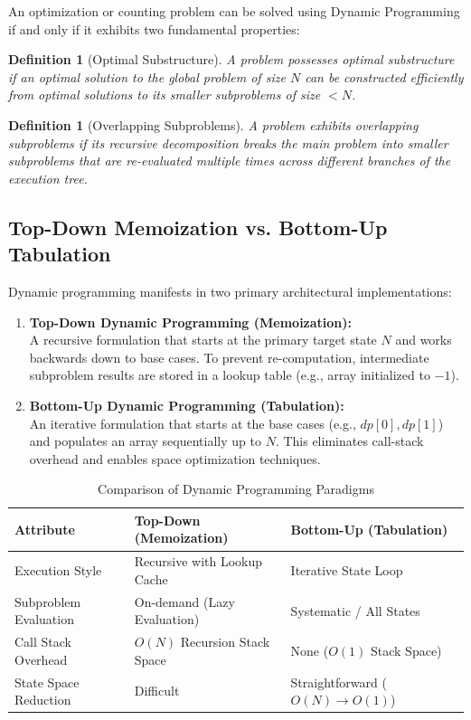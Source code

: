 \documentclass[10pt,journal,compsoc,onecolumn]{IEEEtran}
\newtheorem{definition}[theorem]{Definition}
\begin{document}
An optimization or counting problem can be solved using Dynamic Programming if and only if it exhibits two fundamental properties:

\begin{definition}[Optimal Substructure]
A problem possesses optimal substructure if an optimal solution to the global problem of size $N$ can be constructed efficiently from optimal solutions to its smaller subproblems of size $< N$.
\end{definition}

\begin{definition}[Overlapping Subproblems]
A problem exhibits overlapping subproblems if its recursive decomposition breaks the main problem into smaller subproblems that are re-evaluated multiple times across different branches of the execution tree.
\end{definition}

\subsection{Top-Down Memoization vs. Bottom-Up Tabulation}

Dynamic programming manifests in two primary architectural implementations:

\begin{enumerate}
    \item \textbf{Top-Down Dynamic Programming (Memoization):} \\
    A recursive formulation that starts at the primary target state $N$ and works backwards down to base cases. To prevent re-computation, intermediate subproblem results are stored in a lookup table (e.g., array initialized to $-1$).
    
    \item \textbf{Bottom-Up Dynamic Programming (Tabulation):} \\
    An iterative formulation that starts at the base cases (e.g., $dp[0], dp[1]$) and populates an array sequentially up to $N$. This eliminates call-stack overhead and enables space optimization techniques.
\end{enumerate}

\begin{table}[htbp]
\centering
\caption{Comparison of Dynamic Programming Paradigms}
\label{tab:dp-paradigms}
\begin{tabular}{lll}
\toprule
\textbf{Attribute} & \textbf{Top-Down (Memoization)} & \textbf{Bottom-Up (Tabulation)} \\
\midrule
Execution Style & Recursive with Lookup Cache & Iterative State Loop \\
Subproblem Evaluation & On-demand (Lazy Evaluation) & Systematic / All States \\
Call Stack Overhead & $O(N)$ Recursion Stack Space & None ($O(1)$ Stack Space) \\
State Space Reduction & Difficult & Straightforward ($O(N) \to O(1)$) \\
\bottomrule
\end{tabular}
\end{table}
\end{document}
